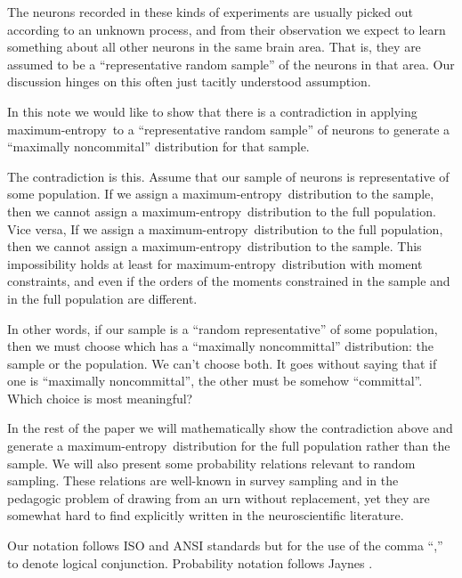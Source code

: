 \documentclass{article}
\theoremstyle{remark}
\theoremstyle{innote}
\newcommand*{\citep}{\parencites}
\renewcommand*{\|}{\mathpunct{|}}%
\theoremstyle{simple}
\newcommand*{\puzzle}{{\fontencoding{U}\fontfamily{fontawesometwo}\selectfont\symbol{225}}}
\newcommand*{\mynote}[1]{ {\color{notecolour}\puzzle\ #1}}
\newcommand*{\me}{maximum-entropy}
\begin{document}
The neurons recorded in these kinds of experiments are usually picked out
according to an unknown process, and from their observation we expect to
learn something about all other neurons in the same brain area. That is,
they are assumed to be a \enquote{representative random sample} of the
neurons in that area. Our discussion hinges on this often just tacitly
understood assumption.


In this note we would like to show that there is a contradiction in
applying \me\ to a \enquote{representative random sample} of neurons to
generate a \enquote{maximally noncommital} distribution for that sample.

The contradiction is this. Assume that our sample of neurons is
representative of some population. If we assign a \me\ distribution to the
sample, then we cannot assign a \me\ distribution to the full population.
Vice versa, If we assign a \me\ distribution to the full population, then
we cannot assign a \me\ distribution to the sample. This impossibility
holds at least for \me\ distribution with moment constraints, and even if
the orders of the moments constrained in the sample and in the full
population are different.

In other words, if our sample is a \enquote{random representative} of some
population, then we must choose which has a \enquote{maximally
  noncommittal} distribution: the sample or the population. We can't choose
both. It goes without saying that if one is \enquote{maximally
  noncommittal}, the other must be somehow \enquote{committal}. Which
choice is most meaningful?

In the rest of the paper we will mathematically show the contradiction
above and generate a \me\ distribution for the full population rather than
the sample. We will also present some probability relations relevant to
random sampling. These relations are well-known in survey sampling and in
the pedagogic problem of drawing from an urn without replacement, yet they
are somewhat hard to find explicitly written in the neuroscientific
literature.

Our notation follows ISO and ANSI standards
\citep{iso1993,ieee1993,nist1995} but for the use of the comma \enquote{,}
to denote logical conjunction. Probability notation follows Jaynes
\citep{jaynes1994_r2003}.
\end{document}
